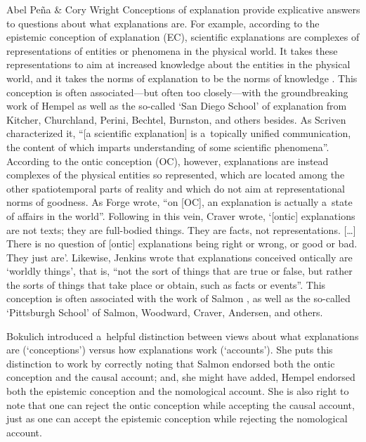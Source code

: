 \begin{editorialeng}{Abel Peña \& Cory Wright}
Conceptions of explanation provide explicative answers to questions about what explanations are. For example, according to the epistemic conception of explanation (EC), scientific explanations are complexes of representations of entities or phenomena in the physical world. It takes these representations to aim at increased knowledge about the entities in the physical world, and it takes the norms of explanation to be the norms of knowledge
\parencite[][p.998]{wright_ontic_2018}. %
 This conception is often associated---but often too closely---with the groundbreaking work of Hempel 
\parencite*[][]{hempel_aspects_1965} %
 as well as the so-called `San Diego School' of explanation from Kitcher, Churchland, Perini, Bechtel, Burnston, and others besides. As Scriven 
\parencite*[][p.224]{scriven_explanations_1962} %
 characterized it, ``[a scientific explanation] is a~topically unified communication, the content of which imparts understanding of some scientific phenomena''. According to the ontic conception (OC), however, explanations are instead complexes of the physical entities so represented, which are located among the other spatiotemporal parts of reality and which do not aim at representational norms of goodness. As Forge 
\parencite*[][p.76]{anapolitanos_explanation_1998} %
 wrote, ``on [OC], an explanation is actually a~state of affairs in the world''. Following in this vein, Craver 
\parencite*[][p.27]{craver_explaining_2007} %
 wrote, `[ontic] explanations are not texts; they are full-bodied things. They are facts, not representations. […] There is no question of [ontic] explanations being right or wrong, or good or bad. They just are'. Likewise, Jenkins 
\parencite*[][p.64]{jenkins_romeo_2008} %
 wrote that explanations conceived ontically are `worldly things', that is, ``not the sort of things that are true or false, but rather the sorts of things that take place or obtain, such as facts or events''. This conception is often associated with the work of Salmon 
\parencite*[][]{salmon_scientific_1984}, %
 as well as the so-called `Pittsburgh School' of Salmon, Woodward, Craver, Andersen, and others.

Bokulich
\parencite*[][p.263]{bokulich_fiction_2016} %
 introduced a~helpful distinction between views about what explanations are (`conceptions') versus how explanations work (`accounts'). She puts this distinction to work by correctly noting that Salmon endorsed both the ontic conception and the causal account; and, she might have added, Hempel endorsed both the epistemic conception and the nomological account. She is also right to note that one can reject the ontic conception while accepting the causal account, just as one can accept the epistemic conception while rejecting the nomological account.


\end{editorialeng}
